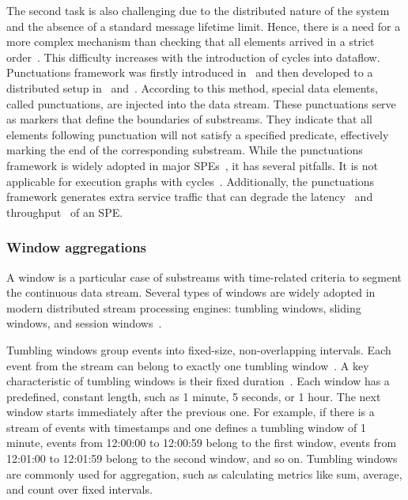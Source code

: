 The second task is also challenging due to the distributed nature of the system and the absence of a standard message lifetime limit. Hence, there is a need for a more complex mechanism than checking that all elements arrived in a strict order~\cite{Li:2008:OPN:1453856.1453890}. This difficulty increases with the introduction of cycles into dataflow. Punctuations framework was firstly introduced in~\cite{Tucker:2003:EPS:776752.776780} and then developed to a distributed setup in~\cite{Akidau:2015:DMP:2824032.2824076} and~\cite{Carbone:2017:SMA:3137765.3137777}. According to this method, special data elements, called punctuations, are injected into the data stream. These punctuations serve as markers that define the boundaries of substreams. They indicate that all elements following punctuation will not satisfy a specified predicate, effectively marking the end of the corresponding substream. While the punctuations framework is widely adopted in major SPEs~\cite{carbone2015apache, Noghabi:2017:SSS:3137765.3137770, Kulkarni:2015:THS:2723372.2742788}, it has several pitfalls. It is not applicable for execution graphs with cycles~\cite{carbone2018scalable}. Additionally, the punctuations framework generates extra service traffic that can degrade the latency~\cite{DBLP:journals/pvldb/BegoliACHKKMS21} and throughput~\cite{Li:2008:OPN:1453856.1453890} of an SPE.

\subsubsection{Window aggregations}

A window is a particular case of substreams with time-related criteria to segment the continuous data stream. Several types of windows are widely adopted in modern distributed stream processing engines: tumbling windows, sliding windows, and session windows~\cite{verwiebe2023survey}.

Tumbling windows group events into fixed-size, non-overlapping intervals. Each event from the stream can belong to exactly one tumbling window~\cite{carbone2019stream}. A key characteristic of tumbling windows is their fixed duration~\cite{patroumpas2006window}. Each window has a predefined, constant length, such as 1 minute, 5 seconds, or 1 hour. The next window starts immediately after the previous one. For example, if there is a stream of events with timestamps and one defines a tumbling window of 1 minute, events from 12:00:00 to 12:00:59 belong to the first window, events from 12:01:00 to 12:01:59 belong to the second window, and so on. Tumbling windows are commonly used for aggregation, such as calculating metrics like sum, average, and count over fixed intervals.

